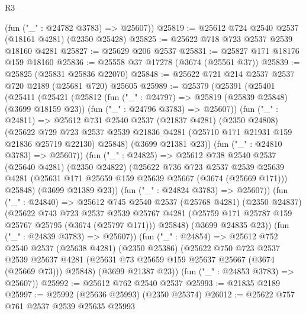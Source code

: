 \begin{lexlean}{R3}
\begin{coremodule}
      (fun ("_" : @24782 @3783) => @25607))
@25819 := @25612 @724 @2540 @2537 (@18161 @4281) (@2350 @25428)
@25825 := @25622 @718 @723 @2537 @2539 @18160 @4281
@25827 := @25629 @206 @2537
@25831 := @25827 @171 @18176 @159 @18160
@25836 := @25558 @37 @17278 (@3674 (@25561 @37))
@25839 := @25825 (@25831 @25836 @22070)
@25848 := @25622 @721 @214 @2537 @2537 @720 @2189 (@25681 @720) @25605
@25989 := @25379
    (@25391
      (@25401
        (@25411
          (@25421
            (@25812
              (fun ("_" : @24797) => @25819 (@25839 @25848) (@3699 @18159 @23))
              (fun ("_" : @24796 @3783) => @25607))
            (fun ("_" : @24811) =>
            @25612
              @731
              @2540
              @2537
              (@21837 @4281)
              (@2350 @24808)
              (@25622
                @729
                @723
                @2537
                @2539
                @21836
                @4281
                (@25710 @171 @21931 @159 @21836 @25719 @22130)
                @25848)
              (@3699 @21381 @23))
            (fun ("_" : @24810 @3783) => @25607))
          (fun ("_" : @24825) =>
          @25612
            @738
            @2540
            @2537
            (@25640 @4281)
            (@2350 @24822)
            (@25622
              @736
              @723
              @2537
              @2539
              @25639
              @4281
              (@25631 @171 @25659 @159 @25639 @25667 (@3674 (@25669 @171)))
              @25848)
            (@3699 @21389 @23))
          (fun ("_" : @24824 @3783) => @25607))
        (fun ("_" : @24840) =>
        @25612
          @745
          @2540
          @2537
          (@25768 @4281)
          (@2350 @24837)
          (@25622
            @743
            @723
            @2537
            @2539
            @25767
            @4281
            (@25759 @171 @25787 @159 @25767 @25795 (@3674 (@25797 @171)))
            @25848)
          (@3699 @24835 @23))
        (fun ("_" : @24839 @3783) => @25607))
      (fun ("_" : @24854) =>
      @25612
        @752
        @2540
        @2537
        (@25638 @4281)
        (@2350 @25386)
        (@25622
          @750
          @723
          @2537
          @2539
          @25637
          @4281
          (@25631 @73 @25659 @159 @25637 @25667 (@3674 (@25669 @73)))
          @25848)
        (@3699 @21387 @23))
      (fun ("_" : @24853 @3783) => @25607))
@25992 := @25612 @762 @2540 @2537
@25993 := @21835 @2189
@25997 := @25992 (@25636 @25993) (@2350 @25374)
@26012 := @25622
    @757
    @761
    @2537
    @2539
    @25635
    @25993

\end{coremodule}
\end{lexlean}
